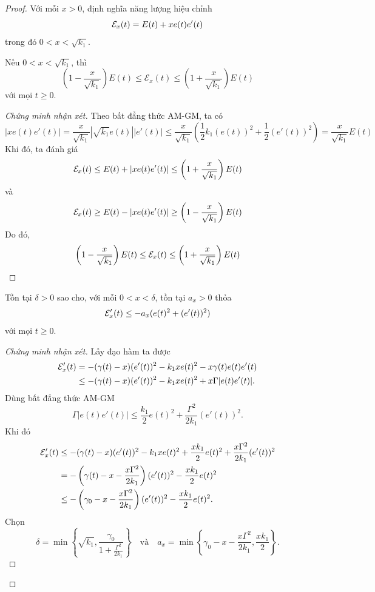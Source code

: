 ﻿\documentclass[12pt]{article}
\begin{document}
\begin{proof}
Với mỗi $x > 0$, định nghĩa năng lượng hiệu chỉnh
\[
 \mathcal{E}_x(t) = E(t) + x e(t)e'(t)
\]
trong đó $0 < x < \sqrt{k_1}$. 
\begin{claim}\label{4.3}
Nếu $0 < x < \sqrt{k_1}$, thì
\[
 \left(1 - \frac{x}{\sqrt{k_1}}\right)E(t)
 \le
 \mathcal E_x(t)
 \le
 \left(1 + \frac{x}{\sqrt{k_1}}\right)E(t)
\]
với mọi $t\ge0$.
\end{claim}
\begin{proof}[Chứng minh nhận xét]
Theo bất đẳng thức AM-GM, ta có
\[
 |xe(t)e'(t)| = \frac{x}{\sqrt{k_1}}\left|\sqrt{k_1}e(t)\right|\left|e'(t)\right| \leq \frac{x}{\sqrt{k_1}}\left(\frac{1}{2}k_1(e(t))^2 + \frac{1}{2}(e'(t))^2\right) = \frac{x}{\sqrt{k_1}}E(t)
\]
    Khi đó, ta đánh giá
\[
 \mathcal{E}_x(t) \leq E(t) + |xe(t)e'(t)| \leq \left(1 + \frac{x}{\sqrt{k_1}}\right)E(t)
\]
và
\[
 \mathcal{E}_x(t) \geq E(t) - |xe(t)e'(t)| \geq \left(1 - \frac{x}{\sqrt{k_1}}\right)E(t)
\]
Do đó,
\[
 \left(1 - \frac{x}{\sqrt{k_1}}\right)E(t) \leq \mathcal{E}_x(t) \leq \left(1 + \frac{x}{\sqrt{k_1}}\right)E(t)
\]
\end{proof}
\begin{claim}\label{4.4}
    Tồn tại $\delta > 0$ sao cho, với mỗi $0 < x < \delta$, tồn tại $a_x > 0$ thỏa
    \[
 \mathcal{E}'_x(t) \leq - a_x(e(t)^2 + (e'(t))^2)
 \]
    với mọi $t \geq 0$.
\end{claim}
\begin{proof}[Chứng minh nhận xét]
    Lấy đạo hàm ta được
\begin{align*}
 \mathcal{E}_x'(t)
 & =
 -(\gamma(t) - x)(e'(t))^2
 -k_1x e(t)^2
 -x\gamma(t)e(t)e'(t)\\
 &\le
 -(\gamma(t) - x)(e'(t))^2
 -k_1x e(t)^2
 +x\Gamma |e(t)e'(t)|.
\end{align*}
Dùng bất đẳng thức AM-GM
\[
 \Gamma |e(t)e'(t)|
 \le
 \frac{k_1}{2}e(t)^2
 +
 \frac{\Gamma^2}{2k_1}(e'(t))^2.
\]
Khi đó
\begin{align*}
 \mathcal{E}_x'(t)
 &\le
 -(\gamma(t) - x)(e'(t))^2
 -k_1x e(t)^2
 +
 \frac{xk_1}{2}e(t)^2
 +
 \frac{x\Gamma^2}{2k_1}(e'(t))^2\\
 & =
 -\left(\gamma(t) - x - \frac{x\Gamma^2}{2k_1}\right)(e'(t))^2
 -
 \frac{xk_1}{2}e(t)^2\\
 &\le
 -\left(\gamma_0 - x - \frac{x\Gamma^2}{2k_1}\right)(e'(t))^2
 -
 \frac{xk_1}{2}e(t)^2.
\end{align*}
    Chọn
\[
 \delta = \min\left\{\sqrt{k_1},\frac{\gamma_0}{1 + \frac{\Gamma^2}{2k_1}}\right\}\quad \text{và}\quad
 a_x = \min\left\{ \gamma_0 - x - \frac{x\Gamma^2}{2k_1}, \frac{xk_1}{2}\right\}.
\]
\end{proof}
\end{proof}
\end{document}

